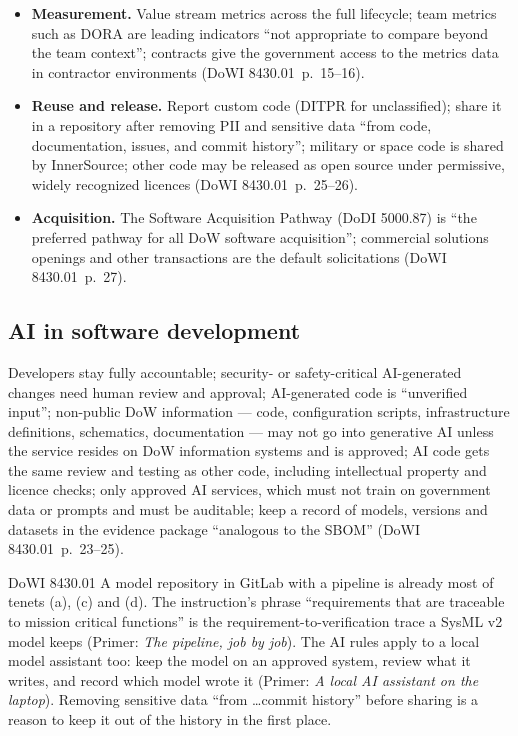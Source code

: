 \documentclass[11pt,letterpaper,twoside,openany]{memoir}
\newcommand{\pg}[2]{{\small(#1~p.~#2)}}          %
\begin{document}
\begin{itemize}
\item \textbf{Measurement.} Value stream metrics across the full lifecycle; team metrics such as DORA are leading
  indicators ``not appropriate to compare beyond the team context''; contracts give the government access to the
  metrics data in contractor environments \pg{DoWI 8430.01}{15--16}.
\item \textbf{Reuse and release.} Report custom code (DITPR for unclassified); share it in a repository after removing
  PII and sensitive data ``from code, documentation, issues, and commit history''; military or space code is shared by
  InnerSource; other code may be released as open source under permissive, widely recognized licences
  \pg{DoWI 8430.01}{25--26}.
\item \textbf{Acquisition.} The Software Acquisition Pathway (DoDI 5000.87) is ``the preferred pathway for all DoW
  software acquisition''; commercial solutions openings and other transactions are the default solicitations
  \pg{DoWI 8430.01}{27}.
\end{itemize}

\subsection{AI in software development}
Developers stay fully accountable; security- or safety-critical AI-generated changes need human review and approval;
AI-generated code is ``unverified input''; non-public DoW information --- code, configuration scripts, infrastructure
definitions, schematics, documentation --- may not go into generative AI unless the service resides on DoW information
systems and is approved; AI code gets the same review and testing as other code, including intellectual property and
licence checks; only approved AI services, which must not train on government data or prompts and must be auditable;
keep a record of models, versions and datasets in the evidence package ``analogous to the SBOM'' \pg{DoWI 8430.01}{23--25}.

\begin{boxteam}{DoWI 8430.01}
A model repository in GitLab with a pipeline is already most of tenets (a), (c) and (d). The instruction's phrase
``requirements that are traceable to mission critical functions'' is the requirement-to-verification trace a SysML v2
model keeps (Primer: \emph{The pipeline, job by job}). The AI rules apply to a local model assistant too: keep the model
on an approved system, review what it writes, and record which model wrote it (Primer: \emph{A local AI assistant on
the laptop}). Removing sensitive data ``from \dots commit history'' before sharing is a reason to keep it out of the
history in the first place.
\end{boxteam}
\end{document}
